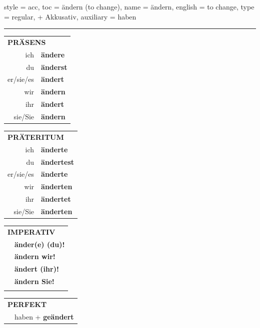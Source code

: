 \begin{verbentry}{
  style = {acc},
  toc = {ändern (to change)},
  name = {ändern},
  english = {to change},
  type = {regular, + Akkusativ},
  auxiliary = {haben}
}
 
    
     \vspace{5pt}

    \hrule
    
    \vspace{5pt}

  \begin{tabular}{rl}
     \multicolumn{2}{l}{\textbf{PRÄSENS} }\\
    ich & \textbf{ändere}\\
    du & \textbf{änderst}\\
    er/sie/es & \textbf{ändert}\\
    wir & \textbf{ändern}\\
    ihr & \textbf{ändert}\\
    sie/Sie & \textbf{ändern}\\
  \end{tabular}
  \hfill
     \begin{tabular}{rl}
    \multicolumn{2}{l}{\textbf{PRÄTERITUM} }\\
    ich & \textbf{änderte}\\
    du & \textbf{ändertest}\\
    er/sie/es & \textbf{änderte}\\
    wir & \textbf{änderten}\\
    ihr & \textbf{ändertet}\\
    sie/Sie & \textbf{änderten}\\
  \end{tabular}
  \hfill
  \begin{tabular}{rl}
     \multicolumn{2}{l}{\textbf{IMPERATIV} }\\
   & \textbf{änder(e) (du)!}\\
   & \textbf{ändern wir!}\\
   & \textbf{ändert (ihr)!}\\
   & \textbf{ändern Sie!}\\
   & \vspace{10pt}
  \end{tabular}

    \vspace{10pt}

 \begin{tabular}{rl}
     \multicolumn{2}{l}{\textbf{PERFEKT}}\\
  &  haben + \textbf{geändert}\\
  \end{tabular}
\hfill
   \begin{tabular}{rl}
   

\end{tabular}
\end{verbentry}
